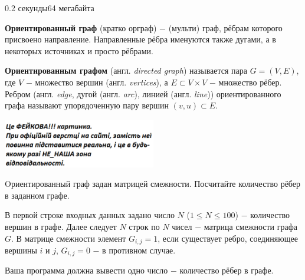 \begin{problem}{}{}{}{0.2 секунды}{64 мегабайта}

{\bf {Ориентированный граф}} (кратко орграф) $-$ (мульти) граф, рёбрам которого присвоено направление. 
Направленные рёбра именуются также дугами, а в некоторых источниках и просто рёбрами. 

{\bf {Ориентированным графом}} (англ. {\emph{directed graph}}) называется пара $G=(V,E)$, где $V$ $-$ множество вершин 
(англ. {\emph{vertices}}), а $E \subset V \times V$ $-$ множество рёбер. 
Ребром (англ. {\emph{edge}}, дугой (англ. {\emph{arc}}), линией (англ. {\emph{line}})) ориентированного графа 
называют упорядоченную пару вершин $(v,u) \subset E$.

 \begin{center}
    \includegraphics[width=0.50\textwidth,natwidth=232,natheight=217]{pic.png}
  \end{center}


Oриентированный граф задан матрицей смежности. Посчитайте количество рёбер в заданном графе.

\InputFile
В первой строке входных данных задано число $N$ ($1 \le N \le 100$) $-$ количество вершин в графе.
Далее следует $N$ строк по $N$ чисел $-$ матрица смежности графа $G$. В матрице смежности элемент $G_{i,j}=1$, если
существует ребро, соединяющее вершины $i$ и $j$, $G_{i,j}=0$ $-$ в противном случае.

\OutputFile
Ваша программа должна вывести одно число $-$ количество рёбер в графе.

\Example

\begin{example}
%
\end{example}

\end{problem}

